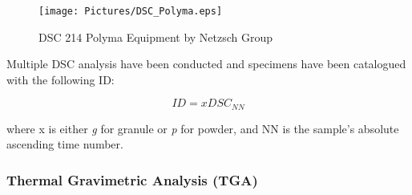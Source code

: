 \documentclass{article}
\begin{document}
                    \begin{figure}[ht]
                        \centering
                        \texttt{[image: Pictures/DSC\_Polyma.eps]}
                        \caption{DSC 214 Polyma Equipment by Netzsch Group}
                        \label{fig:DSC_polyma}
                    \end{figure}

                Multiple DSC analysis have been conducted and specimens have been catalogued with the following ID: 

                \begin{equation}
                    ID = xDSC_{NN}
                    \label{eq:DSC_ID}
                \end{equation}

                where x is either \textit{g} for granule or \textit{p} for powder, and NN is the sample's absolute 
                ascending time number. \\

%
%
                \clearpage

        \subsubsection{Thermal Gravimetric Analysis (TGA)\label{TGA_Analysis}}
        
\end{document}
